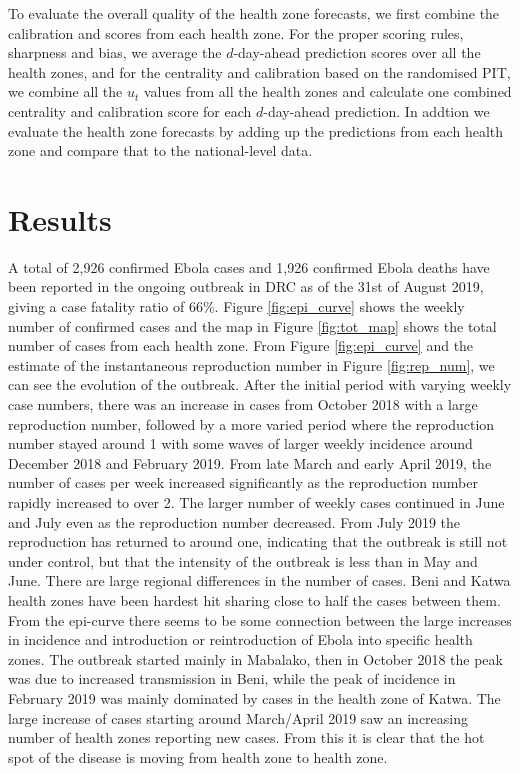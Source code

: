 \documentclass[12pt]{article}
\begin{document}
To evaluate the overall quality of the health zone forecasts, we first combine the calibration and scores from each health zone. For the proper scoring rules, sharpness and bias, we average the $d$-day-ahead prediction scores over all the health zones, and for the centrality and calibration based on the randomised PIT, we combine all the $u_t$ values from all the health zones and calculate one combined centrality and calibration score for each $d$-day-ahead prediction. In addtion we evaluate the health zone forecasts by adding up the predictions from each health zone and compare that to the national-level data.

\section{Results}

A total of 2,926 confirmed Ebola cases and 1,926 confirmed Ebola deaths have been reported in the ongoing outbreak in DRC as of the 31st of August 2019, giving a case fatality ratio of 66\%. Figure \ref{fig:epi_curve} shows the weekly number of confirmed cases and the map in Figure \ref{fig:tot_map} shows the total number of cases from each health zone. From Figure \ref{fig:epi_curve} and the estimate of the instantaneous reproduction number in Figure \ref{fig:rep_num}, we can see the evolution of the outbreak. After the initial period with varying weekly case numbers, there was an increase in cases from October 2018 with a large reproduction number, followed by a more varied period where the reproduction number stayed around 1 with some waves of larger weekly incidence around December 2018 and February 2019. From late March and early April 2019, the number of cases per week increased significantly as the reproduction number rapidly increased to over 2. The larger number of weekly cases continued in June and July even as the reproduction number decreased. From July 2019 the reproduction has returned to around one, indicating that the outbreak is still not under control, but that the intensity of the outbreak is less than in May and June. There are large regional differences in the number of cases. Beni and Katwa health zones have been hardest hit sharing close to half the cases between them. From the epi-curve there seems to be some connection between the large increases in incidence and introduction or reintroduction of Ebola into specific health zones. The outbreak started mainly in Mabalako, then in October 2018 the peak was due to increased transmission in Beni, while the peak of incidence in February 2019 was mainly dominated by cases in the health zone of Katwa. The large increase of cases starting around March/April 2019 saw an increasing number of health zones reporting new cases. From this it is clear that the hot spot of the disease is moving from health zone to health zone.
\end{document}
